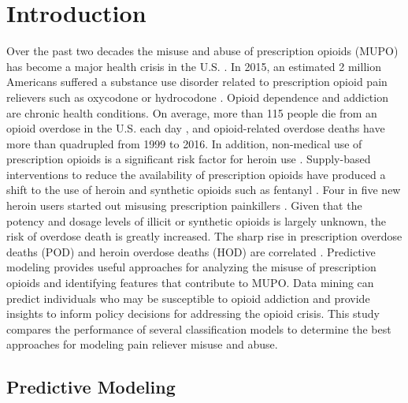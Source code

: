 \documentclass[sigconf]{acmart}
\begin{document}
\section{Introduction}

Over the past two decades the misuse and abuse of prescription opioids 
(MUPO) has become a major health crisis in the U.S. \cite{volkow14}. In 2015, 
an estimated 2 million Americans suffered a substance use disorder related 
to prescription opioid pain relievers such as oxycodone or hydrocodone 
\cite{nida18}. Opioid dependence and addiction are chronic health conditions. 
On average, more than 115 people die from an opioid overdose in the U.S. 
each day \cite{cdc18}, and opioid-related overdose deaths have more than 
quadrupled from 1999 to 2016. In addition, non-medical use of prescription 
opioids is a significant risk factor for heroin use \cite{Rudd16}. 
Supply-based interventions to reduce the availability of prescription opioids 
have produced a shift to the use of heroin and synthetic opioids such as 
fentanyl \cite{jones15}. Four in five new heroin users started out misusing 
prescription painkillers \cite{jones13}. Given that the potency and dosage 
levels of illicit or synthetic opioids is largely unknown, the risk of overdose
death is greatly increased. The sharp rise in prescription overdose deaths 
(POD) and heroin overdose deaths (HOD) are correlated \cite{muhuri13, unick13}. 
Predictive modeling provides useful approaches for analyzing the misuse of
prescription opioids and identifying features that contribute to MUPO. 
Data mining can predict individuals who may be susceptible to opioid addiction 
and provide insights to inform policy decisions for addressing the opioid 
crisis. This study compares the performance of several classification models 
to determine the best approaches for modeling pain reliever misuse and abuse. 


\subsection{Predictive Modeling}
\end{document}
